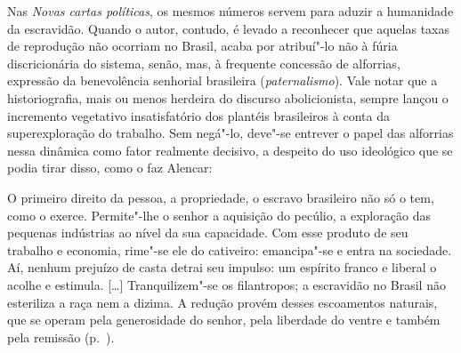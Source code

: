 Nas \textit{Novas cartas políticas}, os mesmos números servem para
aduzir a humanidade da escravidão. Quando o autor, contudo, é levado a reconhecer
que aquelas taxas de reprodução não ocorriam no Brasil, acaba por 
atribuí"-lo não à fúria discricionária do sistema, 
senão, mas, à  frequente concessão de alforrias, expressão da benevolência 
senhorial brasileira (\textit{paternalismo}). Vale notar
que a historiografia, mais ou menos herdeira do discurso abolicionista,
sempre lançou o incremento vegetativo insatisfatório dos plantéis
brasileiros à  conta da superexploração do trabalho. Sem negá"-lo,
deve"-se entrever o papel das alforrias nessa dinâmica como fator
realmente decisivo, a despeito do uso ideológico que se podia tirar
disso, como o faz Alencar: 

\begin{hedraquote}
O primeiro direito da pessoa, a propriedade, o escravo brasileiro não
só o tem, como o exerce. Permite"-lhe o senhor a aquisição do pecúlio,
a exploração das pequenas indústrias ao nível da sua capacidade. Com
esse produto de seu trabalho e economia, rime"-se ele do cativeiro:
emancipa"-se e entra na sociedade. Aí, nenhum prejuízo de casta detrai
seu impulso: um espírito franco e liberal o acolhe e estimula.
[\ldots]
Tranquilizem"-se os filantropos; a escravidão no Brasil não esteriliza
a raça nem a dizima. A redução provém desses escoamentos naturais, que
se operam pela generosidade do senhor, pela liberdade do ventre e
também pela remissão (p.~\pageref{filantropo}). 
\end{hedraquote}

